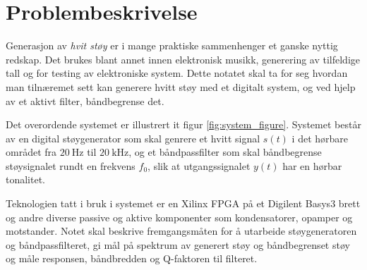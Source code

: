 \section{Problembeskrivelse}
\label{problemBeskrivelse}
Generasjon av \textit{hvit støy} er i mange praktiske sammenhenger et ganske nyttig redskap. Det 
brukes blant annet innen elektronisk musikk, generering av tilfeldige tall og for testing av elektroniske 
system. Dette notatet skal ta for seg hvordan man tilnæremet sett kan generere hvitt støy med et digitalt system,
og ved hjelp av et aktivt filter, båndbegrense det.

Det overordende systemet er illustrert it figur \ref{fig:system_figure}. Systemet består av en 
digital støygenerator som skal genrere et hvitt signal $s(t)$ i det hørbare området fra $\SI{20}{\hertz}$ til 
$\SI{20}{\kilo\hertz}$, og et båndpassfilter som skal båndbegrense støysignalet rundt en frekvens $f_0$, slik at 
utgangssignalet $y(t)$ har en hørbar tonalitet.

Teknologien tatt i bruk i systemet er en Xilinx FPGA på et Digilent Basys3 brett og andre diverse passive og aktive komponenter 
som kondensatorer, opamper og motstander. Notet skal beskrive fremgangsmåten for å utarbeide støygeneratoren og 
båndpassfilteret, gi mål på spektrum av generert støy og båndbegrenset støy og måle responsen, båndbredden og Q-faktoren til filteret.
